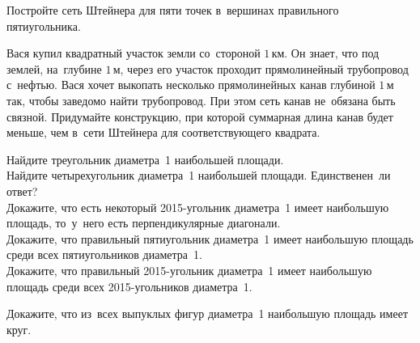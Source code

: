 \begin{problems}
\item
Постройте сеть Штейнера для пяти точек в~вершинах правильного пятиугольника.

\item
Вася купил квадратный участок земли со~стороной $1 \, \text{км}$.
Он знает, что под землей, на~глубине $1 \, \text{м}$, через его участок
проходит прямолинейный трубопровод с~нефтью.
Вася хочет выкопать несколько прямолинейных канав глубиной $1 \, \text{м}$ так,
чтобы заведомо найти трубопровод.
При этом сеть канав не~обязана быть связной.
Придумайте конструкцию, при которой суммарная длина канав будет меньше,
чем в~сети Штейнера для соответствующего квадрата.

\item
\subproblem
Найдите треугольник диаметра~1 наибольшей площади.
\\
\subproblem
Найдите четырехугольник диаметра~1 наибольшей площади.
Единственен~ли ответ?
\\
\subproblem
Докажите, что есть некоторый 2015-угольник диаметра~1 имеет наибольшую
площадь, то~у~него есть перпендикулярные диагонали.
\\
\subproblem
Докажите, что правильный пятиугольник диаметра~1 имеет наибольшую площадь
среди всех пятиугольников диаметра~1.
\\
\subproblem
Докажите, что правильный 2015-угольник диаметра~1 имеет наибольшую площадь
среди всех 2015-угольников диаметра~1.

\item
Докажите, что из~всех выпуклых фигур диаметра~1 наибольшую площадь имеет круг.

\end{problems}

